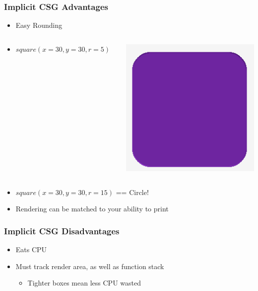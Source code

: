 \documentclass{beamer}
\begin{document}
\begin{frame}
\frametitle{Implicit CSG Advantages}
\begin{itemize}
\item Easy Rounding
\end{itemize}
\begin{columns}
  \begin{column}{0.75\textwidth}
    \begin{itemize}
    \item $square (x=30,y=30,r=5)$
    \end{itemize}
  \end{column}
  \begin{column}{0.25\textwidth}
    \includegraphics[width=1.0\textwidth, right]{website-rounded_square.png}
  \end{column}
\end{columns}
\begin{itemize}
  \item $square (x=30,y=30,r=15)$ == Circle!
  \item Rendering can be matched to your ability to print
\end{itemize}
\end{frame}

\begin{frame}[fragile]
\frametitle{Implicit CSG Disadvantages}
\begin{itemize}
\item Eats CPU
\item Must track render area, as well as function stack
  \begin{itemize}
  \item Tighter boxes mean less CPU wasted
  \end{itemize}
\end{itemize}
\end{frame}
\end{document}
